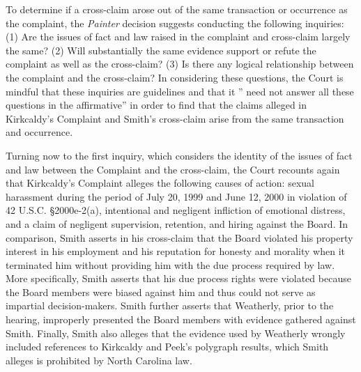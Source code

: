 \documentclass[11pt,letterpaper,twoside]{article}
\begin{document}
To determine if a cross-claim arose out of the same transaction or
occurrence as the complaint, the \emph{Painter} decision suggests
conducting the following inquiries: (1) Are the issues of fact and law
raised in the complaint and cross-claim largely the same? (2) Will
substantially the same evidence support or refute the complaint as well
as the cross-claim? (3) Is there any logical relationship between the
complaint and the cross-claim? In considering these questions, the Court
is mindful that these inquiries are guidelines and that it '' need not
answer all these questions in the affirmative'' in order to find that
the claims alleged in Kirkcaldy's Complaint and Smith's cross-claim
arise from the same transaction and occurrence.

Turning now to the first inquiry, which considers the identity of the
issues of fact and law between the Complaint and the cross-claim, the
Court recounts again that Kirkcaldy's Complaint alleges the following
causes of action: sexual harassment during the period of July 20, 1999
and June 12, 2000 in violation of 42 U.S.C. §2000e-2(a), intentional and
negligent infliction of emotional distress, and a claim of negligent
supervision, retention, and hiring against the Board. In comparison,
Smith asserts in his cross-claim that the Board violated his property
interest in his employment and his reputation for honesty and morality
when it terminated him without providing him with the due process
required by law. More specifically, Smith asserts that his due process
rights were violated because the Board members were biased against him
and thus could not serve as impartial decision-makers. Smith further
asserts that Weatherly, prior to the hearing, improperly presented the
Board members with evidence gathered against Smith. Finally, Smith also
alleges that the evidence used by Weatherly wrongly included references
to Kirkcaldy and Peek's polygraph results, which Smith alleges is
prohibited by North Carolina law.
\end{document}
